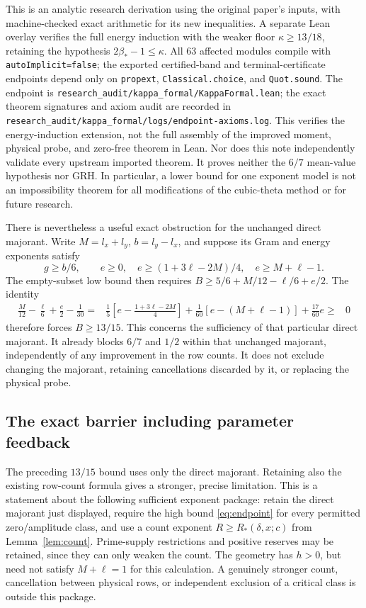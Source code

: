 \documentclass[11pt]{article}
\newcommand{\Bstar}{\beta_*}
\begin{document}
This is an analytic research derivation using the original paper's inputs,
with machine-checked exact arithmetic for its new inequalities. A separate
Lean overlay verifies the full energy induction with the weaker floor
$\kappa\ge13/18$, retaining the hypothesis $2\Bstar-1\le\kappa$.
All 63 affected modules compile with \texttt{autoImplicit=false};
the exported certified-band and terminal-certificate endpoints depend
only on \texttt{propext}, \texttt{Classical.choice}, and \texttt{Quot.sound}.
The endpoint is \nolinkurl{research_audit/kappa_formal/KappaFormal.lean};
the exact theorem signatures and axiom audit are recorded in
\nolinkurl{research_audit/kappa_formal/logs/endpoint-axioms.log}.
This verifies the energy-induction extension, not the full assembly of the
improved moment, physical probe, and zero-free theorem in Lean. Nor does
this note independently validate every upstream imported theorem.
It proves neither the $6/7$ mean-value hypothesis nor GRH. In particular,
a lower bound for one exponent model is not an impossibility theorem for
all modifications of the cubic-theta method or for future research.

There is nevertheless a useful exact obstruction for the unchanged direct
majorant. Write $M=l_x+l_y$, $b=l_y-l_x$, and suppose its Gram and
energy exponents satisfy
\[
 g\ge b/6,\qquad e\ge0,\quad
 e\ge(1+3\ell-2M)/4,\quad e\ge M+\ell-1.
\]
The empty-subset low bound then requires
$B\ge5/6+M/12-\ell/6+e/2$. The identity
\begin{align*}
 \frac M{12}-\frac\ell6+\frac e2-\frac1{30}
 ={}&\frac15\left[e-\frac{1+3\ell-2M}{4}\right]
 +\frac1{60}\left[e-(M+\ell-1)\right]+\frac{17}{60}e
 \ge{}&0
\end{align*}
therefore forces $B\ge13/15$. This concerns the sufficiency of that
particular direct majorant. It already blocks $6/7$ and $1/2$ within
that unchanged majorant, independently of any improvement in the row
counts. It does not exclude changing the majorant, retaining cancellations
discarded by it, or replacing the physical probe.

\subsection*{The exact barrier including parameter feedback}

The preceding $13/15$ bound uses only the direct majorant. Retaining also
the existing row-count formula gives a stronger, precise limitation.
This is a statement about the following sufficient exponent package:
retain the direct majorant just displayed, require the high bound
\eqref{eq:endpoint} for every permitted zero/amplitude class, and use a
count exponent $R\ge R_*(\delta,x;c)$ from Lemma~\ref{lem:count}.
Prime-supply restrictions and positive reserves may be retained, since
they can only weaken the count. The geometry has $h>0$, but need not
satisfy $M+\ell=1$ for this calculation. A genuinely stronger count,
cancellation between physical rows, or independent exclusion of a critical
class is outside this package.
\end{document}
